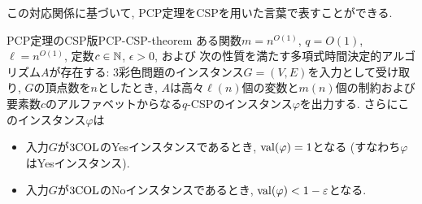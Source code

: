 この対応関係に基づいて, PCP定理をCSPを用いた言葉で表すことができる.

\begin{theorem}{PCP定理のCSP版}{PCP-CSP-theorem}
  ある関数$m=n^{O(1)}$, $q=O(1)$, $\ell=n^{O(1)}$, 定数$c\in\mathbb{N}$, $\epsilon>0$, および
  次の性質を満たす多項式時間決定的アルゴリズム$A$が存在する:
  3彩色問題のインスタンス$G=(V,E)$を入力として受け取り, $G$の頂点数を$n$としたとき, $A$は高々$\ell(n)$個の変数と$m(n)$個の制約および要素数$c$のアルファベットからなる$q$-CSPのインスタンス$\varphi$を出力する.
  さらにこのインスタンス$\varphi$は
  \begin{itemize}
  \item 入力$G$が$\mathrm{3COL}$のYesインスタンスであるとき, $\mathrm{val}(\varphi) = 1  $となる (すなわち$\varphi$はYesインスタンス).
  \item 入力$G$が$\mathrm{3COL}$のNoインスタンスであるとき, $\mathrm{val}(\varphi) < 1-\varepsilon$となる.
  \end{itemize}
\end{theorem}

